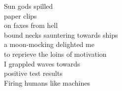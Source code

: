 Sun gods spilled\\
paper clips\\
on faxes from hell\\
bound necks sauntering towards ships\\
a moon-mocking delighted me\\
to reprieve the loins of motivation\\
I grappled waves towards\\
positive test results\\
Firing humans like machines\\

